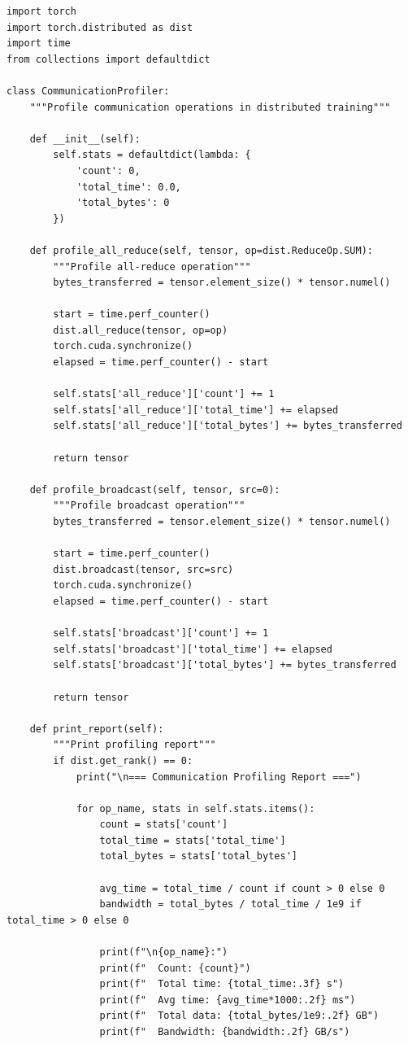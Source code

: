 \begin{lstlisting}[style=python, caption=Profile distributed communication patterns]
import torch
import torch.distributed as dist
import time
from collections import defaultdict

class CommunicationProfiler:
    """Profile communication operations in distributed training"""

    def __init__(self):
        self.stats = defaultdict(lambda: {
            'count': 0,
            'total_time': 0.0,
            'total_bytes': 0
        })

    def profile_all_reduce(self, tensor, op=dist.ReduceOp.SUM):
        """Profile all-reduce operation"""
        bytes_transferred = tensor.element_size() * tensor.numel()

        start = time.perf_counter()
        dist.all_reduce(tensor, op=op)
        torch.cuda.synchronize()
        elapsed = time.perf_counter() - start

        self.stats['all_reduce']['count'] += 1
        self.stats['all_reduce']['total_time'] += elapsed
        self.stats['all_reduce']['total_bytes'] += bytes_transferred

        return tensor

    def profile_broadcast(self, tensor, src=0):
        """Profile broadcast operation"""
        bytes_transferred = tensor.element_size() * tensor.numel()

        start = time.perf_counter()
        dist.broadcast(tensor, src=src)
        torch.cuda.synchronize()
        elapsed = time.perf_counter() - start

        self.stats['broadcast']['count'] += 1
        self.stats['broadcast']['total_time'] += elapsed
        self.stats['broadcast']['total_bytes'] += bytes_transferred

        return tensor

    def print_report(self):
        """Print profiling report"""
        if dist.get_rank() == 0:
            print("\n=== Communication Profiling Report ===")

            for op_name, stats in self.stats.items():
                count = stats['count']
                total_time = stats['total_time']
                total_bytes = stats['total_bytes']

                avg_time = total_time / count if count > 0 else 0
                bandwidth = total_bytes / total_time / 1e9 if total_time > 0 else 0

                print(f"\n{op_name}:")
                print(f"  Count: {count}")
                print(f"  Total time: {total_time:.3f} s")
                print(f"  Avg time: {avg_time*1000:.2f} ms")
                print(f"  Total data: {total_bytes/1e9:.2f} GB")
                print(f"  Bandwidth: {bandwidth:.2f} GB/s")
\end{lstlisting}

